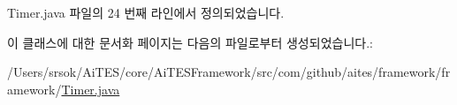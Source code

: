 Timer.\+java 파일의 24 번째 라인에서 정의되었습니다.



이 클래스에 대한 문서화 페이지는 다음의 파일로부터 생성되었습니다.\+:\begin{DoxyCompactItemize}
\item 
/\+Users/srsok/\+Ai\+T\+E\+S/core/\+Ai\+T\+E\+S\+Framework/src/com/github/aites/framework/framework/\mbox{\hyperlink{_timer_8java}{Timer.\+java}}\end{DoxyCompactItemize}
